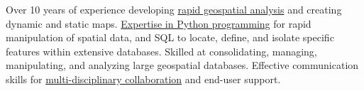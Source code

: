\documentclass[letterpaper]{article}
\newcommand{\impt}[1]{\uline{#1}}
\begin{document}
{%
%

Over 10 years of experience developing
\impt{rapid geospatial analysis} and creating dynamic and static maps.
\impt{Expertise in Python programming} for rapid manipulation of spatial data,
and SQL to locate, define, and isolate specific features within extensive databases.
Skilled at consolidating, managing, manipulating, and analyzing large geospatial databases.
Effective communication skills for \impt{multi-disciplinary collaboration} and end-user support.

}
\end{document}
